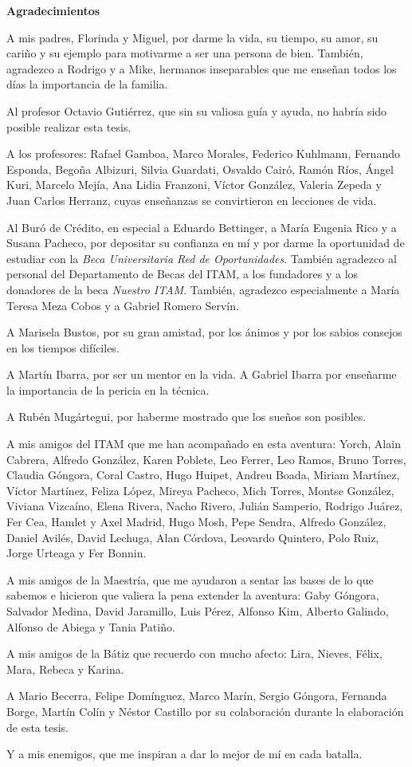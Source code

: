 \begin{center}
{\huge \bfseries Agradecimientos\\}
\end{center}

A mis padres, Florinda y Miguel, por darme la vida, su tiempo, su amor, su cariño y su ejemplo para motivarme a ser una persona de bien. También, agradezco a Rodrigo y a Mike, hermanos inseparables	 que me enseñan todos los días la importancia de la familia.

Al profesor Octavio Gutiérrez, que sin su valiosa guía y ayuda, no habría sido posible realizar esta tesis.

A los profesores: Rafael Gamboa, Marco Morales, Federico Kuhlmann, Fernando Esponda, Begoña Albizuri, Silvia Guardati, Osvaldo Cairó, Ramón Ríos, Ángel Kuri, Marcelo Mejía, Ana Lidia Franzoni, Víctor González, Valeria Zepeda y Juan Carlos Herranz, cuyas enseñanzas se convirtieron en lecciones de vida.

Al Buró de Crédito, en especial a Eduardo Bettinger, a María Eugenia Rico y a Susana Pacheco, por depositar su confianza en mí y por darme la oportunidad de estudiar con la \emph{Beca Universitaria Red de Oportunidades}. También agradezco al personal del Departamento de Becas del ITAM, a los fundadores y a los donadores de la beca \emph{Nuestro ITAM}. También, agradezco especialmente a María Teresa Meza Cobos y a Gabriel Romero Servín.

A Marisela Bustos, por su gran amistad, por los ánimos y por los sabios consejos en los tiempos difíciles.

A Martín Ibarra, por ser un mentor en la vida. A Gabriel Ibarra por enseñarme la importancia de la pericia en la técnica.

A Rubén Mugártegui, por haberme mostrado que los sueños son posibles.

A mis amigos del ITAM que me han acompañado en esta aventura: Yorch, Alain Cabrera, Alfredo González, Karen Poblete, Leo Ferrer, Leo Ramos, Bruno Torres, Claudia Góngora, Coral Castro, Hugo Huipet, Andreu Boada, Miriam Martínez, Víctor Martínez, Feliza López, Mireya Pacheco, Mich Torres, Montse González, Viviana Vizcaíno, Elena Rivera, Nacho Rivero, Julián Samperio, Rodrigo Juárez, Fer Cea, Hamlet y Axel Madrid, Hugo Mosh, Pepe Sendra, Alfredo González, Daniel Avilés, David Lechuga, Alan Córdova, Leovardo Quintero, Polo Ruiz, Jorge Urteaga y Fer Bonnin.

A mis amigos de la Maestría, que me ayudaron a sentar las bases de lo que sabemos e hicieron que valiera la pena extender la aventura: Gaby Góngora, Salvador Medina, David Jaramillo, Luis Pérez, Alfonso Kim, Alberto Galindo, Alfonso de Abiega y Tania Patiño.

A mis amigos de la Bátiz que recuerdo con mucho afecto: Lira, Nieves, Félix, Mara, Rebeca y Karina.

A Mario Becerra, Felipe Domínguez, Marco Marín, Sergio Góngora, Fernanda Borge, Martín Colín y Néstor Castillo por su colaboración durante la elaboración de esta tesis.

Y a mis enemigos, que me inspiran a dar lo mejor de mí en cada batalla.
\clearpage